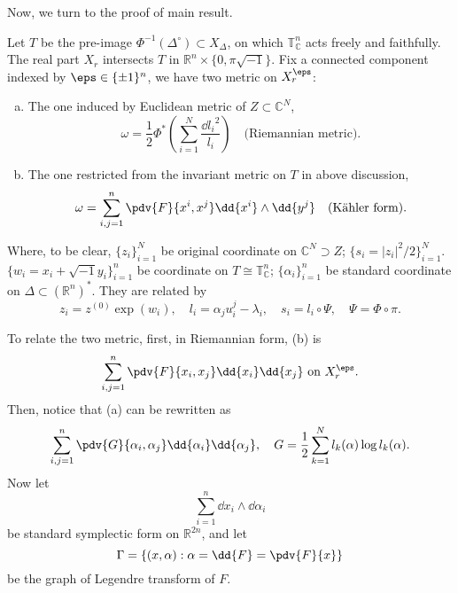 \documentclass[12pt]{article}
\theoremstyle{plain}\newtheorem{theorem}{Theorem}
\theoremstyle{definition}\newtheorem{definition}[theorem]{Definition}
\theoremstyle{definition}\newtheorem{example}[theorem]{Example}
\theoremstyle{plain}\newtheorem{axiom}[theorem]{Axiom}
\theoremstyle{plain}\newtheorem{assertion}[theorem]{Assertion}
\theoremstyle{plain}\newtheorem{corollary}[theorem]{Corollary}
\theoremstyle{plain}\newtheorem{lemma}[theorem]{Lemma}
\theoremstyle{plain}\newtheorem{proposition}[theorem]{Proposition}
\theoremstyle{plain}\newtheorem{prop}[theorem]{Proposition}
\theoremstyle{plain}\newtheorem{conjecture}[theorem]{Conjecture}
\theoremstyle{plain}\newtheorem{conj}[theorem]{Conjecture}
\theoremstyle{plain}\newtheorem{problem}[theorem]{Problem}
\theoremstyle{remark}\newtheorem{notation}[theorem]{Notation}
\theoremstyle{definition}\newtheorem*{question}{Question}
\theoremstyle{definition}\newtheorem*{answer}{Answer}
\theoremstyle{definition}\newtheorem*{goal}{Goal}
\theoremstyle{plain}\newtheorem*{application}{Application}
\theoremstyle{plain}\newtheorem*{exercise}{Exercise}
\theoremstyle{remark}\newtheorem*{remark}{Remark}
\theoremstyle{remark}\newtheorem*{note}{\small{Note}}
\numberwithin{equation}{section}
\numberwithin{theorem}{section}
\numberwithin{figure}{section}
\begin{document}
Now, we turn to the proof of main result.

Let \(T\) be the pre-image \(\Phi^{-1}(\Delta^\circ)\subset X_\Delta\), on which
\(\mathbb{T}_{\mathbb{C}}^n\) acts freely and faithfully. The real part \(X_r\)
intersects \(T\) in \(\mathbb{R}^n\times \{0,\pi\sqrt{-1}\}\). Fix a connected
component indexed by \(\eps \in \{\pm 1\}^n\), we have two metric on \(X_r^{\eps}\):
\begin{enumerate}[(a)]
\item The one induced by Euclidean metric of \(Z\subset \mathbb{C}^N\), 
\begin{equation}\label{eq:oemga-riemannian}
    \omega=\frac{1}{2}\Phi^*\left(\sum_{i=1}^N \frac{\dd{l_i}^2}{l_i}\right)
    \quad\text{(Riemannian metric)}
.\end{equation}
\item The one restricted from the invariant metric on \(T\) in above discussion,
    \begin{equation}\label{eq:omega-kahler}
    \omega=\sum_{i,j=1}^n \pdv{F}{x^i,x^j}\dd{x^i}\wedge\dd{y^j}
    \quad\text{(K\"ahler form)}
    .\end{equation}
\end{enumerate}
Where, to be clear, \(\{z_i\}_{i=1}^N\) be original coordinate on
\(\mathbb{C}^N\supset Z\); \(\{s_i=|z_i|^2/2\}_{i=1}^N\).
\(\{w_i=x_i+\sqrt{-1}y_i\}_{i=1}^n\) be coordinate on
\(T\cong\mathbb{T}_{\mathbb{C}}^n\); \(\{\alpha_i\}_{i=1}^n\) be standard coordinate
on \(\Delta\subset (\mathbb{R}^n)^*\). They are related by \[
    z_i=z^{(0)}\exp(w_i),\quad
    l_i=\alpha_j u^j_i-\lambda_i,\quad
    s_i=l_i\circ \Psi,\quad
    \Psi=\Phi\circ \pi
.\] 

To relate the two metric, first, in Riemannian form, (b) is \[
    \sum_{i,j=1}^n \pdv{F}{x_i,x_j} \dd{x_i}\dd{x_j} \text{ on }X_r^\eps
.\] Then, notice that (a) can be rewritten as
\begin{equation}\label{eq:potential-in-l}
    \sum_{i,j=1}^n \pdv{G}{\alpha_i,\alpha_j} \dd{\alpha_i}\dd{\alpha_j},\quad
    G=\frac{1}{2}\sum_{k=1}^N l_k(\alpha)\log l_k(\alpha)
.\end{equation}
Now let \[
    \sum_{i=1}^n \dd{x_i}\wedge \dd{\alpha_i}
\] be standard symplectic form on \(\mathbb{R}^{2n}\), and let \[
    \Gamma=\left\{(x,\alpha):\alpha=\dd{F}=\pdv{F}{x}\right\}
\] be the graph of Legendre transform of \(F\).
\end{document}
